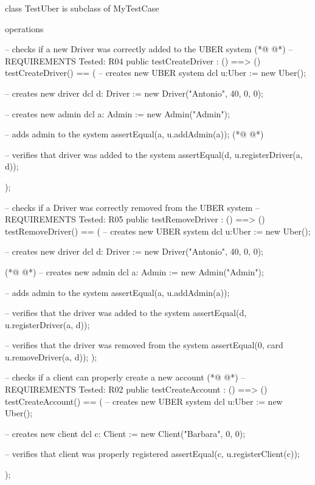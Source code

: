 \begin{vdmpp}[breaklines=true]
class TestUber is subclass of MyTestCase

operations

 -- checks if a new Driver was correctly added to the UBER system
(*@
\label{testCreateDriver:6}
@*)
 -- REQUIREMENTS Tested: R04
 public testCreateDriver : () ==> ()
  testCreateDriver() == (
    -- creates new UBER system
    dcl u:Uber := new Uber();
    
    -- creates new driver
   dcl d: Driver := new Driver("Antonio", 40, 0, 0);
   
   -- creates new admin
   dcl a: Admin := new Admin("Admin");
   
   -- adds admin to the system
   assertEqual({a}, u.addAdmin(a));
(*@
\label{testRemoveDriver:20}
@*)
   
   -- verifies that driver was added to the system
   assertEqual({d}, u.registerDriver(a, d)); 
   
  );
  
  -- checks if a Driver was correctly removed from the UBER system
  -- REQUIREMENTS Tested: R05
  public testRemoveDriver : () ==> ()
   testRemoveDriver() == (
    -- creates new UBER system
     dcl u:Uber := new Uber();
    
     -- creates new driver
     dcl d: Driver := new Driver("Antonio", 40, 0, 0);
    
(*@
\label{testCreateAccount:36}
@*)
    -- creates new admin
    dcl a: Admin := new Admin("Admin");
   
    -- adds admin to the system
    assertEqual({a}, u.addAdmin(a));
    
    -- verifies that the driver was added to the system
     assertEqual({d}, u.registerDriver(a, d));
    
    -- verifies that the driver was removed from the system
    assertEqual(0, card u.removeDriver(a, d));   
   );
  
  -- checks if a client can properly create a new account
(*@
\label{testRemoveClient:50}
@*)
  -- REQUIREMENTS Tested: R02
  public testCreateAccount : () ==> ()
   testCreateAccount() == (
    -- creates new UBER system
     dcl u:Uber := new Uber();
     
     -- creates new client
     dcl c: Client := new Client("Barbara", 0, 0);
     
     -- verifies that client was properly registered
     assertEqual({c}, u.registerClient(c));
    
   );
  

\end{vdmpp}
